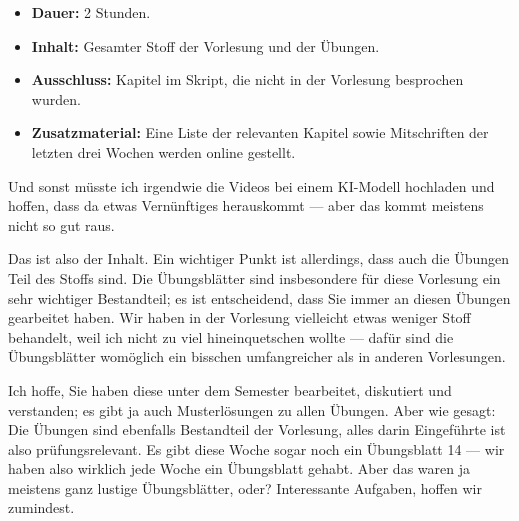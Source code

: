 \begin{math-stroke}[Prüfungsmodalitäten]
\begin{itemize}
    \item \textbf{Dauer:} 2 Stunden.
    \item \textbf{Inhalt:} Gesamter Stoff der Vorlesung und der Übungen.
    \item \textbf{Ausschluss:} Kapitel im Skript, die nicht in der Vorlesung besprochen wurden.
    \item \textbf{Zusatzmaterial:} Eine Liste der relevanten Kapitel sowie Mitschriften der letzten drei Wochen werden online gestellt.
\end{itemize}
\end{math-stroke}

\begin{spoken-clean}[01:08:54 - 01:11:39]
Und sonst müsste ich irgendwie die Videos bei einem KI-Modell hochladen und hoffen, dass da etwas Vernünftiges herauskommt --- aber das kommt meistens nicht so gut raus.

Das ist also der Inhalt. Ein wichtiger Punkt ist allerdings, dass auch die Übungen Teil des Stoffs sind. Die Übungsblätter sind insbesondere für diese Vorlesung ein sehr wichtiger Bestandteil; es ist entscheidend, dass Sie immer an diesen Übungen gearbeitet haben. Wir haben in der Vorlesung vielleicht etwas weniger Stoff behandelt, weil ich nicht zu viel hineinquetschen wollte --- dafür sind die Übungsblätter womöglich ein bisschen umfangreicher als in anderen Vorlesungen. 

Ich hoffe, Sie haben diese unter dem Semester bearbeitet, diskutiert und verstanden; es gibt ja auch Musterlösungen zu allen Übungen. Aber wie gesagt: Die Übungen sind ebenfalls Bestandteil der Vorlesung, alles darin Eingeführte ist also prüfungsrelevant. Es gibt diese Woche sogar noch ein Übungsblatt 14 --- wir haben also wirklich jede Woche ein Übungsblatt gehabt. Aber das waren ja meistens ganz lustige Übungsblätter, oder? Interessante Aufgaben, hoffen wir zumindest.
\end{spoken-clean}

